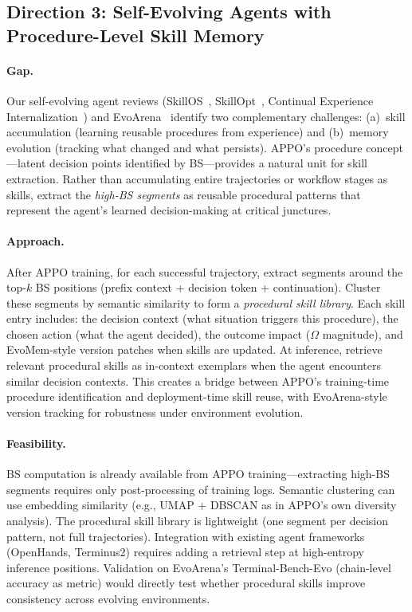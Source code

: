 \documentclass[11pt,a4paper]{article}
\begin{document}
\subsection{Direction 3: Self-Evolving Agents with Procedure-Level Skill Memory}

\paragraph{Gap.} Our self-evolving agent reviews (SkillOS~\cite{chen2026skillos}, SkillOpt~\cite{li2026skillopt}, Continual Experience Internalization~\cite{liu2026continual}) and EvoArena~\cite{xu2026evoarena} identify two complementary challenges: (a)~skill accumulation (learning reusable procedures from experience) and (b)~memory evolution (tracking what changed and what persists). APPO's procedure concept---latent decision points identified by BS---provides a natural unit for skill extraction. Rather than accumulating entire trajectories or workflow stages as skills, extract the \emph{high-BS segments} as reusable procedural patterns that represent the agent's learned decision-making at critical junctures.

\paragraph{Approach.} After APPO training, for each successful trajectory, extract segments around the top-$k$ BS positions (prefix context + decision token + continuation). Cluster these segments by semantic similarity to form a \emph{procedural skill library}. Each skill entry includes: the decision context (what situation triggers this procedure), the chosen action (what the agent decided), the outcome impact ($\Omega$ magnitude), and EvoMem-style version patches when skills are updated. At inference, retrieve relevant procedural skills as in-context exemplars when the agent encounters similar decision contexts. This creates a bridge between APPO's training-time procedure identification and deployment-time skill reuse, with EvoArena-style version tracking for robustness under environment evolution.

\paragraph{Feasibility.} BS computation is already available from APPO training---extracting high-BS segments requires only post-processing of training logs. Semantic clustering can use embedding similarity (e.g., UMAP + DBSCAN as in APPO's own diversity analysis). The procedural skill library is lightweight (one segment per decision pattern, not full trajectories). Integration with existing agent frameworks (OpenHands, Terminus2) requires adding a retrieval step at high-entropy inference positions. Validation on EvoArena's Terminal-Bench-Evo (chain-level accuracy as metric) would directly test whether procedural skills improve consistency across evolving environments.
\end{document}
